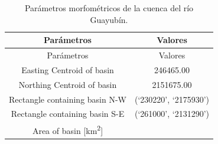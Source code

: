 \documentclass[11pt,]{article}
\begin{document}
\begin{longtable}[]{@{}cc@{}}
\caption{\label{tab:parametrosm}Parámetros morfométricos de la cuenca
del río Guayubín.}\tabularnewline
\toprule
\begin{minipage}[b]{0.65\columnwidth}\centering\strut
Parámetros\strut
\end{minipage} & \begin{minipage}[b]{0.29\columnwidth}\centering\strut
Valores\strut
\end{minipage}\tabularnewline
\midrule
\endfirsthead
\toprule
\begin{minipage}[b]{0.65\columnwidth}\centering\strut
Parámetros\strut
\end{minipage} & \begin{minipage}[b]{0.29\columnwidth}\centering\strut
Valores\strut
\end{minipage}\tabularnewline
\midrule
\endhead
\begin{minipage}[t]{0.65\columnwidth}\centering\strut
Easting Centroid of basin\strut
\end{minipage} & \begin{minipage}[t]{0.29\columnwidth}\centering\strut
246465.00\strut
\end{minipage}\tabularnewline
\begin{minipage}[t]{0.65\columnwidth}\centering\strut
Northing Centroid of basin\strut
\end{minipage} & \begin{minipage}[t]{0.29\columnwidth}\centering\strut
2151675.00\strut
\end{minipage}\tabularnewline
\begin{minipage}[t]{0.65\columnwidth}\centering\strut
Rectangle containing basin N-W\strut
\end{minipage} & \begin{minipage}[t]{0.29\columnwidth}\centering\strut
(`230220', `2175930')\strut
\end{minipage}\tabularnewline
\begin{minipage}[t]{0.65\columnwidth}\centering\strut
Rectangle containing basin S-E\strut
\end{minipage} & \begin{minipage}[t]{0.29\columnwidth}\centering\strut
(`261000', `2131290')\strut
\end{minipage}\tabularnewline
\begin{minipage}[t]{0.65\columnwidth}\centering\strut
Area of basin {[}km\textsuperscript{2}{]}\strut
\end{minipage} & \begin{minipage}[t]{0.29\columnwidth}\centering\strut

\end{minipage}
\end{longtable}
\end{document}

